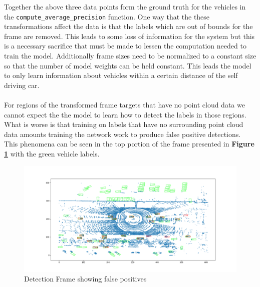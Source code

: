 \documentclass[letter]{article}
\newcommand{\fref}[1]{\textbf{Figure \ref{#1}}}
\begin{document}
	Together the above three data points form the ground truth for the vehicles in the \verb|compute_average_precision| function. One way that the these transformations affect the data is that the labels which are out of bounds for the frame are removed. This leads to some loss of information for the system but this is a necessary sacrifice that must be made to lessen the computation needed to train the model. Additionally frame sizes need to be normalized to a constant size so that the number of model weights can be held constant. This leads the model to only learn information about vehicles within a certain distance of the self driving car.\\\\
	For regions of the transformed frame targets that have no point cloud data we cannot expect the the model to learn how to detect the labels in those regions. What is worse is that training on labels that have no surrounding point cloud data amounts training the network work to produce false positive detections. This phenomena can be seen in the top portion of the frame presented in \fref{fig:false-positive} with the green vehicle labels.
	
	\begin{figure}[h]
		\centering
		\includegraphics[width=\linewidth]{images/false-positives.png}
		\caption{Detection Frame showing false positives}
		\label{fig:false-positive}
	\end{figure}
	
\end{document}
